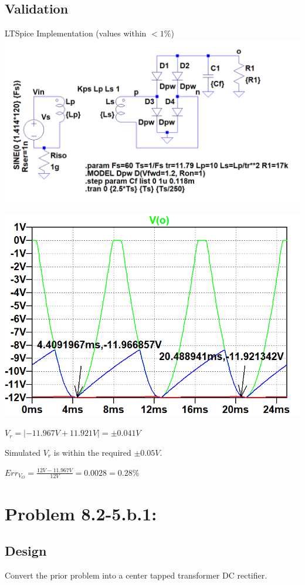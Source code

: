 \documentclass[12pt,letterpaper,titlepage]{article}
\begin{document}
\begin{raggedright}
\clearpage
\subsection{Validation}

\begin{center}
LTSpice Implementation (values within $<1\%$)
\includegraphics[width=.8\textwidth, height=\textheight, keepaspectratio=true]{ds1b}

\includegraphics[width=.7\textwidth, height=\textheight, keepaspectratio=true]{ds1c}

$V_r = |-11.967V+11.921V| = \pm0.041V$

Simulated $V_r$ is within the required $\pm0.05V$. 

$Err_{V_O} = \frac{12V-11.967V}{12V} = 0.0028 = 0.28\%$
\end{center}

\clearpage
\section{Problem 8.2-5.b.1: }
\subsection{Design}

Convert the prior problem into a center tapped transformer DC rectifier.


\end{raggedright}
\end{document}

